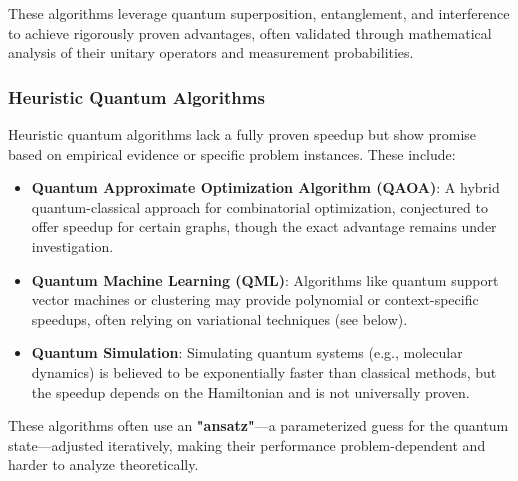These algorithms leverage quantum superposition, entanglement, and
interference to achieve rigorously proven advantages, often validated through
mathematical analysis of their unitary operators and measurement probabilities.

\subsubsection*{Heuristic Quantum Algorithms}

Heuristic quantum algorithms lack a fully proven speedup but show promise
based on empirical evidence or specific problem instances. These include:

\begin{itemize}
  \item \textbf{Quantum Approximate Optimization Algorithm (QAOA)}: A hybrid
    quantum-classical approach for combinatorial optimization, conjectured to
    offer speedup for certain graphs, though the exact advantage remains
    under investigation.

  \item \textbf{Quantum Machine Learning (QML)}: Algorithms like quantum
    support vector machines or clustering may provide polynomial or
    context-specific speedups, often relying on variational techniques (see
    below).

  \item \textbf{Quantum Simulation}: Simulating quantum systems (e.g.,
    molecular dynamics) is believed to be exponentially faster than classical
    methods, but the speedup depends on the Hamiltonian and is not
    universally proven.
\end{itemize}

These algorithms often use an \textbf{"ansatz"}—a parameterized guess for the
quantum state—adjusted iteratively, making their performance
problem-dependent and harder to analyze theoretically.



